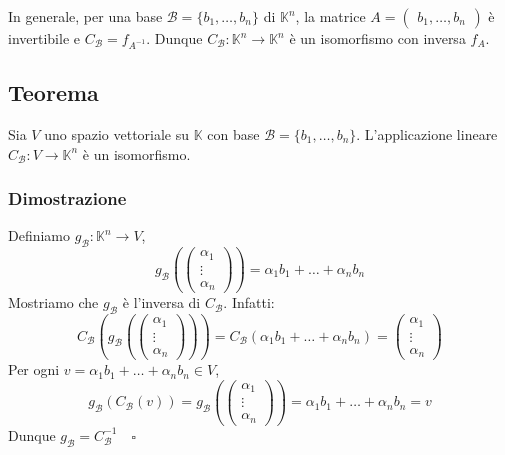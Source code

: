 \documentclass[a4paper]{article}
\theoremstyle{break}
\theoremstyle{break}
\theoremstyle{break}
\theoremstyle{break}
\begin{document}
\noindent In generale, per una base \( \mathcal{B} = \{b_1, \ldots, b_n\}  \) di
\( \mathbb{K}^n \), la matrice \( A = \begin{pmatrix} b_1, \ldots, b_n \end{pmatrix}  \) è
invertibile e \( C_{\mathcal{B}} = f_{A^{-1}} \). Dunque \( C_{\mathcal{B}}: \mathbb{K}^n
\to \mathbb{K}^n\) è un isomorfismo con inversa \( f_A \).

\subsection{Teorema}
Sia \( V \) uno spazio vettoriale su \( \mathbb{K} \) con base \( \mathcal{B} = \{b_1,
\ldots, b_n\}  \). L'applicazione lineare \( C_{\mathcal{B}}: V \to \mathbb{K}^n  \) è
un isomorfismo.

\subsubsection{Dimostrazione}
Definiamo \( g_{\mathcal{B}}: \mathbb{K}^n \to V \),
\[
  g_{\mathcal{B}}\left( \begin{pmatrix} \alpha_1\\\vdots\\\alpha_n \end{pmatrix}  \right)=
  \alpha_1 b_1 + \ldots + \alpha_n b_n
\] 
Mostriamo che \( g_{\mathcal{B}} \) è l'inversa di \( C_{\mathcal{B}} \). Infatti:
\[
  C_{\mathcal{B}}\left(g_{\mathcal{B}}\left( \begin{pmatrix} 
      \alpha_1\\
      \vdots\\
      \alpha_n
\end{pmatrix}  \right) \right) = C_{\mathcal{B}}(\alpha_1 b_1 + \ldots + \alpha_n b_n) =
\begin{pmatrix} \alpha_1\\\vdots\\\alpha_n \end{pmatrix} 
\] 
Per ogni \( v = \alpha_1 b_1 + \ldots + \alpha_n b_n \in V \),
\[
  g_{\mathcal{B}}\left( C_{\mathcal{B}}(v) \right) = g_{\mathcal{B}}\left( \begin{pmatrix} 
      \alpha_1\\
      \vdots\\
      \alpha_n
  \end{pmatrix}  \right) = \alpha_1 b_1 + \ldots + \alpha_n b_n = v
\] 
Dunque \( g_{\mathcal{B}} = C_{\mathcal{B}}^{-1} \quad \square\) 
\end{document}
